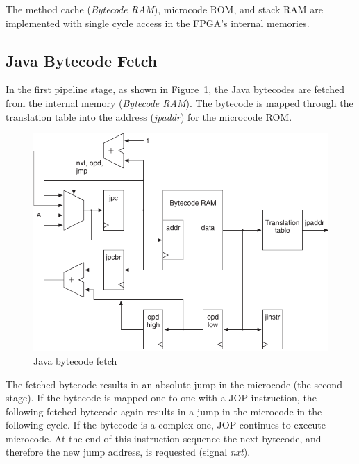 The method cache (\emph{Bytecode RAM}), microcode ROM, and stack RAM
are implemented with single cycle access in the FPGA's internal
memories.



\subsection{Java Bytecode Fetch}

In the first pipeline stage, as shown in
Figure~\ref{fig_arch_bc_fetch}, the Java bytecodes are fetched from
the internal memory (\emph{Bytecode RAM}). The bytecode is mapped
through the translation table into the address (\emph{jpaddr}) for
the microcode ROM.

\begin{figure}
    \centering
    \includegraphics[scale=\picscale]{arch/arch_bcfetch}
    \caption{Java bytecode fetch}
    \label{fig_arch_bc_fetch}
\end{figure}

The fetched bytecode results in an absolute jump in the microcode
(the second stage). If the bytecode is mapped one-to-one with a JOP
instruction, the following fetched bytecode again results in a jump
in the microcode in the following cycle. If the bytecode is a
complex one, JOP continues to execute microcode. At the end of this
instruction sequence the next bytecode, and therefore the new jump
address, is requested (signal \emph{nxt}).

